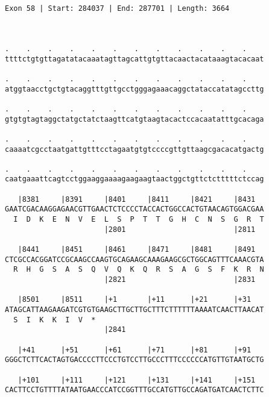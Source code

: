 \documentclass{article}
\begin{document}
\begin{Verbatim}
                                     
 
Exon 58 | Start: 284037 | End: 287701 | Length: 3664



.    .    .    .    .    .    .    .    .    .    .    .    
ttttctgtgttagatatacaaatagttagcattgtgttacaactacataaagtacacaat
                                                            
.    .    .    .    .    .    .    .    .    .    .    .    
atggtaacctgctgtacaggtttgttgcctgggagaaacaggctataccatatagccttg
                                                            
.    .    .    .    .    .    .    .    .    .    .    .    
gtgtgtagtaggctatgctatctaagttcatgtaagtacactccacaatatttgcacaga
                                                            
.    .    .    .    .    .    .    .    .    .    .    .    
caaaatcgcctaatgattgtttcctagaatgtgtccccgttgttaagcgacacatgactg
                                                            
.    .    .    .    .    .    .    .    .    .    .    .    
caatgaaattcagtcctggaaggaaaagaagaagtaactggctgttctctttttctccag
                                                            
   |8381     |8391     |8401     |8411     |8421     |8431  
GAATCGACAAGGAGAACGTTGAACTCTCCCCTACCACTGGCCACTGTAACAGTGGACGAA
  I  D  K  E  N  V  E  L  S  P  T  T  G  H  C  N  S  G  R  T
                       |2801                         |2811  
  
   |8441     |8451     |8461     |8471     |8481     |8491  
CTCGCCACGGATCCGCAAGCCAAGTGCAGAAGCAAAGAAGCGCTGGCAGTTTCAAACGTA
  R  H  G  S  A  S  Q  V  Q  K  Q  R  S  A  G  S  F  K  R  N
                       |2821                         |2831  
  
   |8501     |8511     |+1       |+11      |+21      |+31   
ATAGCATTAAGAAGATCGTGTGAAGCTTGCTTGCTTTCTTTTTTAAAATCAACTTAACAT
  S  I  K  K  I  V  *   
                       |2841                                
  
   |+41      |+51      |+61      |+71      |+81      |+91   
GGGCTCTTCACTAGTGACCCCTTCCCTGTCCTTGCCCTTTCCCCCCATGTTGTAATGCTG
                                                            
   |+101     |+111     |+121     |+131     |+141     |+151  
CACTTCCTGTTTTATAATGAACCCATCCGGTTTGCCATGTTGCCAGATGATCAACTCTTC
                                                            

\end{Verbatim}
\end{document}
